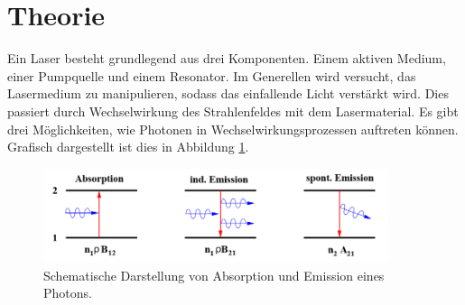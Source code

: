 \section{Theorie}
Ein Laser besteht grundlegend aus drei Komponenten.
Einem aktiven Medium, einer Pumpquelle und einem Resonator.
Im Generellen wird versucht, das Lasermedium zu manipulieren,
sodass das einfallende Licht verstärkt wird.
Dies passiert durch Wechselwirkung des Strahlenfeldes mit dem Lasermaterial.
Es gibt drei Möglichkeiten, wie Photonen in Wechselwirkungsprozessen auftreten können.
Grafisch dargestellt ist dies in Abbildung \ref{fig:emission}.

\begin{figure}[H]
  \centering
  \includegraphics[width=0.9\textwidth]{Bilder/emission.png}
  \caption{Schematische Darstellung von Absorption und Emission eines Photons.\cite{anleitung}}
  \label{fig:emission}
\end{figure}

